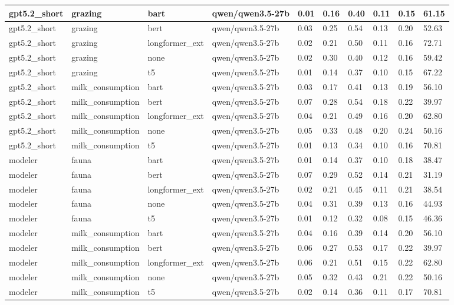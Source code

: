 \begin{tabular}{|l|l|l|l|l|l|l|l|l|l|}
 \hline
 gpt5.2\_short & grazing & bart & qwen/qwen3.5-27b & 0.01 & 0.16 & 0.40 & 0.11 & 0.15 & 61.15 \\
 \hline
 gpt5.2\_short & grazing & bert & qwen/qwen3.5-27b & 0.03 & 0.25 & 0.54 & 0.13 & 0.20 & 52.63 \\
 \hline
 gpt5.2\_short & grazing & longformer\_ext & qwen/qwen3.5-27b & 0.02 & 0.21 & 0.50 & 0.11 & 0.16 & 72.71 \\
 \hline
 gpt5.2\_short & grazing & none & qwen/qwen3.5-27b & 0.02 & 0.30 & 0.40 & 0.12 & 0.16 & 59.42 \\
 \hline
 gpt5.2\_short & grazing & t5 & qwen/qwen3.5-27b & 0.01 & 0.14 & 0.37 & 0.10 & 0.15 & 67.22 \\
 \hline
 gpt5.2\_short & milk\_consumption & bart & qwen/qwen3.5-27b & 0.03 & 0.17 & 0.41 & 0.13 & 0.19 & 56.10 \\
 \hline
 gpt5.2\_short & milk\_consumption & bert & qwen/qwen3.5-27b & 0.07 & 0.28 & 0.54 & 0.18 & 0.22 & 39.97 \\
 \hline
 gpt5.2\_short & milk\_consumption & longformer\_ext & qwen/qwen3.5-27b & 0.04 & 0.21 & 0.49 & 0.16 & 0.20 & 62.80 \\
 \hline
 gpt5.2\_short & milk\_consumption & none & qwen/qwen3.5-27b & 0.05 & 0.33 & 0.48 & 0.20 & 0.24 & 50.16 \\
 \hline
 gpt5.2\_short & milk\_consumption & t5 & qwen/qwen3.5-27b & 0.01 & 0.13 & 0.34 & 0.10 & 0.16 & 70.81 \\
 \hline
 modeler & fauna & bart & qwen/qwen3.5-27b & 0.01 & 0.14 & 0.37 & 0.10 & 0.18 & 38.47 \\
 \hline
 modeler & fauna & bert & qwen/qwen3.5-27b & 0.07 & 0.29 & 0.52 & 0.14 & 0.21 & 31.19 \\
 \hline
 modeler & fauna & longformer\_ext & qwen/qwen3.5-27b & 0.02 & 0.21 & 0.45 & 0.11 & 0.21 & 38.54 \\
 \hline
 modeler & fauna & none & qwen/qwen3.5-27b & 0.04 & 0.31 & 0.39 & 0.13 & 0.16 & 44.93 \\
 \hline
 modeler & fauna & t5 & qwen/qwen3.5-27b & 0.01 & 0.12 & 0.32 & 0.08 & 0.15 & 46.36 \\
 \hline
 modeler & milk\_consumption & bart & qwen/qwen3.5-27b & 0.04 & 0.16 & 0.39 & 0.14 & 0.20 & 56.10 \\
 \hline
 modeler & milk\_consumption & bert & qwen/qwen3.5-27b & 0.06 & 0.27 & 0.53 & 0.17 & 0.22 & 39.97 \\
 \hline
 modeler & milk\_consumption & longformer\_ext & qwen/qwen3.5-27b & 0.06 & 0.21 & 0.51 & 0.15 & 0.22 & 62.80 \\
 \hline
 modeler & milk\_consumption & none & qwen/qwen3.5-27b & 0.05 & 0.32 & 0.43 & 0.21 & 0.22 & 50.16 \\
 \hline
 modeler & milk\_consumption & t5 & qwen/qwen3.5-27b & 0.02 & 0.14 & 0.36 & 0.11 & 0.17 & 70.81 \\
\hline
\end{tabular}
